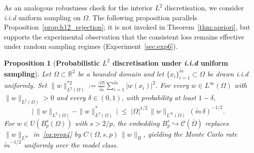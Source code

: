 \documentclass[11pt]{article}
\newtheorem{proposition}[theorem]{Proposition}
\newcommand{\C}{\mathcal{C}}
\begin{document}
 




As an analogous robustness check for the interior $L^2$ discretisation,
we consider {\em i.i.d} uniform sampling on $\Omega$. The following
proposition parallels Proposition~\ref{prop:h12_rejection}; it is not
invoked in Theorem~\ref{thm:apriori}, but supports the experimental
observation that the consistent loss remains effective under random
sampling regimes (Experiment~\ref{sec:exp6}).
 
\begin{proposition}[\textbf{Probabilistic $L^2$ discretisation under
{\em i.i.d} uniform sampling}]\label{prop:l2_rejection}
Let $\Omega\subset\mathbb{R}^2$ be a bounded domain and let
$\{x_i\}_{i=1}^{\tilde m}\subset\Omega$ be drawn {\em i.i.d} uniformly.
Set $\|w\|^{*2}_{L^2(\Omega)} := \tfrac{|\Omega|}{\tilde m}
\sum_{i=1}^{\tilde m}|w(x_i)|^2$.
For every $w\in L^\infty(\Omega)$ with $\|w\|_{L^2(\Omega)}>0$ and
every $\delta\in(0,1)$, with probability at least $1-\delta$,
\begin{equation}\label{eq:prop4}
  \bigl|\,\|w\|_{L^2(\Omega)} - \|w\|^*_{L^2(\Omega)}\,\bigr|
  \;\le\; |\Omega|^{1/2}\,\|w\|_{L^\infty(\Omega)}\,(\tilde m\,\delta)^{-1/2}.
\end{equation}
For $w \in U(B^s_p(\Omega))$ with $s > 2/p$, the embedding
$B^s_p \hookrightarrow \C(\bar\Omega)$ replaces $\|w\|_{L^\infty}$
in~\eqref{eq:prop4} by $C(\Omega,s,p)\,\|w\|_B$, yielding the Monte
Carlo rate $\tilde m^{-1/2}$ uniformly over the model class.
\end{proposition}
 
\end{document}
